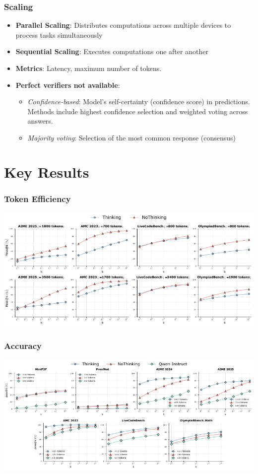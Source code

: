 \documentclass[student, noshadow, lsr, english, aspectratio=169]{ITR_LSR_slides}
\begin{document}
\begin{frame}
	\frametitle{Scaling}
	\begin{itemize}
		\item \textbf{Parallel Scaling}: Distributes computations across multiple devices to process tasks simultaneously
		\item \textbf{Sequential Scaling}: Executes computations one after another 
		\item \textbf{Metrics}: Latency, maximum number of tokens.
		\item \textbf{Perfect verifiers not available}:
		\begin{itemize}
			\item \textit{Confidence-based}: Model's self-certainty (confidence score) in predictions. Methods include highest confidence selection and weighted voting across answers.
			\item \textit{Majority voting}: Selection of the most common response (consensus)
		\end{itemize}
	\end{itemize}
\end{frame}


\section{Key Results}

\begin{frame}
	\frametitle{Token Efficiency}
	\centering
    \includegraphics[width=\textwidth]{Fig5_Control.pdf}
\end{frame}

\begin{frame}
	\frametitle{Accuracy}
	\centering
    \includegraphics[width=\textwidth]{Fig4_NoControl.pdf}
\end{frame}
\end{document}
